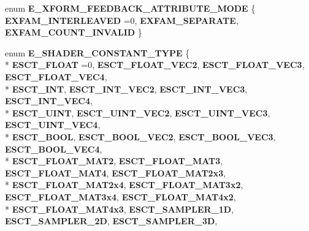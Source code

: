\begin{DoxyCompactItemize}
\item 
enum {\bfseries E\+\_\+\+X\+F\+O\+R\+M\+\_\+\+F\+E\+E\+D\+B\+A\+C\+K\+\_\+\+A\+T\+T\+R\+I\+B\+U\+T\+E\+\_\+\+M\+O\+DE} \{ {\bfseries E\+X\+F\+A\+M\+\_\+\+I\+N\+T\+E\+R\+L\+E\+A\+V\+ED} =0, 
{\bfseries E\+X\+F\+A\+M\+\_\+\+S\+E\+P\+A\+R\+A\+TE}, 
{\bfseries E\+X\+F\+A\+M\+\_\+\+C\+O\+U\+N\+T\+\_\+\+I\+N\+V\+A\+L\+ID}
 \}\hypertarget{namespaceirr_1_1video_a525f62e348b4384565f830c17b043811}{}\label{namespaceirr_1_1video_a525f62e348b4384565f830c17b043811}

\item 
enum {\bfseries E\+\_\+\+S\+H\+A\+D\+E\+R\+\_\+\+C\+O\+N\+S\+T\+A\+N\+T\+\_\+\+T\+Y\+PE} \{ \\*
{\bfseries E\+S\+C\+T\+\_\+\+F\+L\+O\+AT} =0, 
{\bfseries E\+S\+C\+T\+\_\+\+F\+L\+O\+A\+T\+\_\+\+V\+E\+C2}, 
{\bfseries E\+S\+C\+T\+\_\+\+F\+L\+O\+A\+T\+\_\+\+V\+E\+C3}, 
{\bfseries E\+S\+C\+T\+\_\+\+F\+L\+O\+A\+T\+\_\+\+V\+E\+C4}, 
\\*
{\bfseries E\+S\+C\+T\+\_\+\+I\+NT}, 
{\bfseries E\+S\+C\+T\+\_\+\+I\+N\+T\+\_\+\+V\+E\+C2}, 
{\bfseries E\+S\+C\+T\+\_\+\+I\+N\+T\+\_\+\+V\+E\+C3}, 
{\bfseries E\+S\+C\+T\+\_\+\+I\+N\+T\+\_\+\+V\+E\+C4}, 
\\*
{\bfseries E\+S\+C\+T\+\_\+\+U\+I\+NT}, 
{\bfseries E\+S\+C\+T\+\_\+\+U\+I\+N\+T\+\_\+\+V\+E\+C2}, 
{\bfseries E\+S\+C\+T\+\_\+\+U\+I\+N\+T\+\_\+\+V\+E\+C3}, 
{\bfseries E\+S\+C\+T\+\_\+\+U\+I\+N\+T\+\_\+\+V\+E\+C4}, 
\\*
{\bfseries E\+S\+C\+T\+\_\+\+B\+O\+OL}, 
{\bfseries E\+S\+C\+T\+\_\+\+B\+O\+O\+L\+\_\+\+V\+E\+C2}, 
{\bfseries E\+S\+C\+T\+\_\+\+B\+O\+O\+L\+\_\+\+V\+E\+C3}, 
{\bfseries E\+S\+C\+T\+\_\+\+B\+O\+O\+L\+\_\+\+V\+E\+C4}, 
\\*
{\bfseries E\+S\+C\+T\+\_\+\+F\+L\+O\+A\+T\+\_\+\+M\+A\+T2}, 
{\bfseries E\+S\+C\+T\+\_\+\+F\+L\+O\+A\+T\+\_\+\+M\+A\+T3}, 
{\bfseries E\+S\+C\+T\+\_\+\+F\+L\+O\+A\+T\+\_\+\+M\+A\+T4}, 
{\bfseries E\+S\+C\+T\+\_\+\+F\+L\+O\+A\+T\+\_\+\+M\+A\+T2x3}, 
\\*
{\bfseries E\+S\+C\+T\+\_\+\+F\+L\+O\+A\+T\+\_\+\+M\+A\+T2x4}, 
{\bfseries E\+S\+C\+T\+\_\+\+F\+L\+O\+A\+T\+\_\+\+M\+A\+T3x2}, 
{\bfseries E\+S\+C\+T\+\_\+\+F\+L\+O\+A\+T\+\_\+\+M\+A\+T3x4}, 
{\bfseries E\+S\+C\+T\+\_\+\+F\+L\+O\+A\+T\+\_\+\+M\+A\+T4x2}, 
\\*
{\bfseries E\+S\+C\+T\+\_\+\+F\+L\+O\+A\+T\+\_\+\+M\+A\+T4x3}, 
{\bfseries E\+S\+C\+T\+\_\+\+S\+A\+M\+P\+L\+E\+R\+\_\+1D}, 
{\bfseries E\+S\+C\+T\+\_\+\+S\+A\+M\+P\+L\+E\+R\+\_\+2D}, 
{\bfseries E\+S\+C\+T\+\_\+\+S\+A\+M\+P\+L\+E\+R\+\_\+3D}, 

\end{DoxyCompactItemize}
